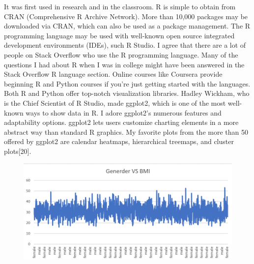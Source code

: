 \documentclass[journal]{IEEEtran}
\begin{document}
\par It was first used in research and in the classroom. R is simple to obtain from CRAN (Comprehensive R Archive Network). More than 10,000 packages may be downloaded via CRAN, which can also be used as a package management. The R programming language may be used with well-known open source integrated development environments (IDEs), such R Studio. I agree that there are a lot of people on Stack Overflow who use the R programming language. Many of the questions I had about R when I was in college might have been answered in the Stack Overflow R language section. Online courses like Coursera provide beginning R and Python courses if you're just getting started with the languages. Both R and Python offer top-notch visualization libraries. Hadley Wickham, who is the Chief Scientist of R Studio, made ggplot2, which is one of the most well-known ways to show data in R. I adore ggplot2's numerous features and adaptability options. ggplot2 lets users customize charting elements in a more abstract way than standard R graphics. My favorite plots from the more than 50 offered by ggplot2 are calendar heatmaps, hierarchical treemaps, and cluster plots[20]. 

\begin{figure}[h]
  \centering
  \includegraphics [width= 3.55 in]{1.png}
\caption{}
  \label{storage}
\end{figure}
\end{document}
